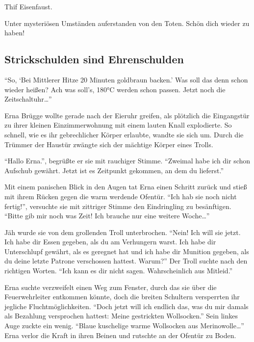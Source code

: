 \documentclass[]{multiversum}
\begin{document}
\begin{center}
   Thif Eisenfaust.
\end{center}
\vspace{-0.5em}
Unter mysteriösen Umständen auferstanden von den Toten. Schön dich wieder zu haben!

\subsection{Strickschulden sind Ehrenschulden}
\enquote{So, \enquote{Bei Mittlerer Hitze 20 Minuten goldbraun backen.} Was soll das denn schon wieder heißen? Ach was soll's, 180°C werden schon passen.
Jetzt noch die Zeitschaltuhr\dots}

Erna Brügge wollte gerade nach der Eieruhr greifen, als plötzlich die Eingangstür zu ihrer kleinen Einzimmerwohnung mit einem lauten Knall explodierte. So schnell, wie es ihr gebrechlicher Körper erlaubte, wandte sie sich um. Durch die Trümmer der Haustür zwängte sich der mächtige Körper eines Trolls.

\enquote{Hallo Erna.}, begrüßte er sie mit rauchiger Stimme.
\enquote{Zweimal habe ich dir schon Aufschub gewährt. Jetzt ist es Zeitpunkt gekommen, an dem du lieferst.}

Mit einem panischen Blick in den Augen tat Erna einen Schritt zurück und stieß mit ihrem Rücken gegen die warm werdende Ofentür. \enquote{Ich hab sie noch nicht fertig!}, versuchte sie mit zittriger Stimme den Eindringling zu besänftigen. \enquote{Bitte gib mir noch was Zeit! Ich brauche nur eine weitere Woche\dots}

Jäh wurde sie von dem grollenden Troll unterbrochen.
\enquote{Nein! Ich will sie jetzt. Ich habe dir Essen gegeben, als du am Verhungern warst. Ich habe dir Unterschlupf gewährt, als es geregnet hat und ich habe dir Munition gegeben, als du deine letzte Patrone verschossen hattest. Warum?} Der Troll suchte nach den richtigen Worten. \enquote{Ich kann es dir nicht sagen. Wahrscheinlich aus Mitleid.}

Erna suchte verzweifelt einen Weg zum Fenster, durch das sie über die Feuerwehrleiter entkommen könnte, doch die breiten Schultern versperrten ihr jegliche Fluchtmöglichkeiten.
\enquote{Doch jetzt will ich endlich das, was du mir damals als Bezahlung versprochen hattest: Meine gestrickten Wollsocken.} Sein linkes Auge zuckte ein wenig. \enquote{Blaue kuschelige warme Wollsocken aus Merinowolle\dots}
Erna verlor die Kraft in ihren Beinen und rutschte an der Ofentür zu Boden.
\end{document}
